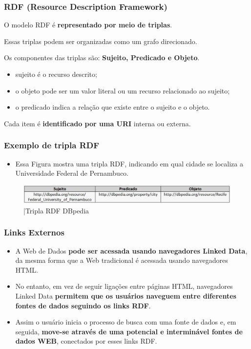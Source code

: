 \documentclass[hyperref={pdfpagelabels=false}]{beamer}
\begin{document}
\begin{frame}
\frametitle{RDF (Resource Description Framework)}
\begin{itemize}
  \item{O modelo RDF é \textbf{representado por meio de triplas}. 
  \item Essas triplas podem ser organizadas como um grafo direcionado.}
  \item Os componentes das triplas são: \textbf{Sujeito, Predicado e Objeto}. 
  \begin{itemize}
  		\item sujeito é o recurso descrito; 
        \item o objeto pode ser um valor literal ou um recurso relacionado ao sujeito; 
        \item o predicado indica a relação que existe entre o sujeito e o objeto.
  \end{itemize}    
 \item Cada item é \textbf{identificado por uma URI} interna ou externa. \cite{tavares2015}
\end{itemize}  
\end{frame}

\begin{frame}
\frametitle{Exemplo de tripla RDF}
\begin{itemize}
 \item{ Essa Figura mostra uma tripla RDF, indicando em qual cidade se localiza a Universidade Federal de Pernambuco. }
\end{itemize}  

\begin{figure}[h]
	\centering
		\includegraphics[scale=0.3]{img/tripla_RDF_DBpedia}
	\caption{|Tripla RDF DBpedia}
	\label{fig:tripla_RDF_DBpedia}
\end{figure}
\end{frame}



\begin{frame}
\frametitle{Links Externos}
\begin{itemize}
  \item{A Web de Dados \textbf{pode ser acessada usando navegadores Linked Data}, da mesma forma que a Web tradicional é acessada usando navegadores HTML.}
  \item{No entanto, em vez de seguir ligações entre páginas HTML, navegadores Linked Data \textbf{permitem que os usuários naveguem entre diferentes fontes de dados seguindo os links RDF}.}
  \item{Assim o usuário inicia o processo de busca com uma fonte de dados e, em seguida, \textbf{move-se através de uma potencial e interminável fontes de dados WEB}, conectados por esses links RDF. \cite{Paletta2015} }
\end{itemize}  
\end{frame}
\end{document}
